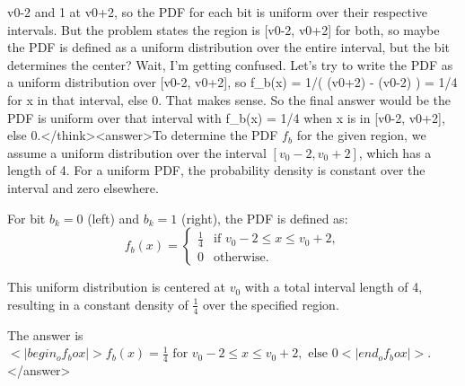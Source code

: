 v0-2 and 1 at v0+2, so the PDF for each bit is uniform over their respective intervals. But the problem states the region is [v0-2, v0+2] for both, so maybe the PDF is defined as a uniform distribution over the entire interval, but the bit determines the center? Wait, I'm getting confused. Let's try to write the PDF as a uniform distribution over [v0-2, v0+2], so f_b(x) = 1/( (v0+2) - (v0-2) ) = 1/4 for x in that interval, else 0. That makes sense. So the final answer would be the PDF is uniform over that interval with f_b(x) = 1/4 when x is in [v0-2, v0+2], else 0.</think><answer>To determine the PDF \( f_b \) for the given region, we assume a uniform distribution over the interval \([v_0 - 2, v_0 + 2]\), which has a length of 4. For a uniform PDF, the probability density is constant over the interval and zero elsewhere.  

For bit \( b_k = 0 \) (left) and \( b_k = 1 \) (right), the PDF is defined as:  
\[
f_b(x) = \begin{cases} 
\frac{1}{4} & \text{if } v_0 - 2 \leq x \leq v_0 + 2, \\
0 & \text{otherwise}.
\end{cases}
\]  

This uniform distribution is centered at \( v_0 \) with a total interval length of 4, resulting in a constant density of \( \frac{1}{4} \) over the specified region.  

The answer is \(<|begin_of_box|>f_b(x) = \frac{1}{4} \text{ for } v_0 - 2 \leq x \leq v_0 + 2, \text{ else } 0<|end_of_box|>\).</answer>